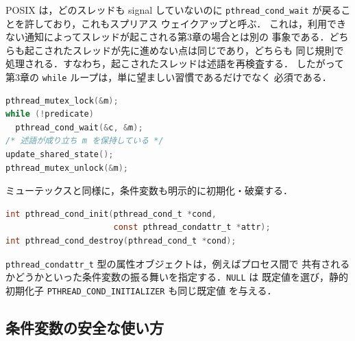 \documentclass[../main.tex]{subfiles}
\begin{document}
POSIX は，どのスレッドも signal していないのに
\texttt{pthread\_cond\_wait} が戻ることを許しており，これもスプリアス
ウェイクアップと呼ぶ．%
これは，利用できない通知によってスレッドが起こされる第3章の場合とは別の
事象である．どちらも起こされたスレッドが先に進めない点は同じであり，どちらも
同じ規則で処理される．すなわち，起こされたスレッドは述語を再検査する．
したがって第3章の \texttt{while} ループは，単に望ましい習慣であるだけでなく
必須である．
\begin{lstlisting}[language=C, numbers=none]
pthread_mutex_lock(&m);
while (!predicate)
  pthread_cond_wait(&c, &m);
/* 述語が成り立ち m を保持している */
update_shared_state();
pthread_mutex_unlock(&m);
\end{lstlisting}

ミューテックスと同様に，条件変数も明示的に初期化・破棄する．
\begin{lstlisting}[language=C, numbers=none]
int pthread_cond_init(pthread_cond_t *cond,
                      const pthread_condattr_t *attr);
int pthread_cond_destroy(pthread_cond_t *cond);
\end{lstlisting}
\texttt{pthread\_condattr\_t} 型の属性オブジェクトは，例えばプロセス間で
共有されるかどうかといった条件変数の振る舞いを指定する．\texttt{NULL} は
既定値を選び，静的初期化子 \texttt{PTHREAD\_COND\_INITIALIZER} も同じ既定値
を与える．

\subsection{条件変数の安全な使い方}
\end{document}
